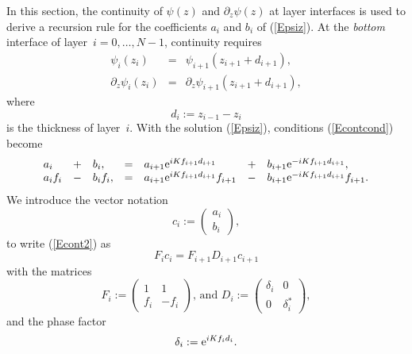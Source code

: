 In this section,
the continuity of $\psi(z)$ and $\partial_z\psi(z)$ at layer interfaces
is used to derive a recursion rule
for the coefficients $a_i$ and $b_i$ of (\ref{Epsiz}).
At the \textit{bottom} interface of layer~$i=0,\ldots,N-1$,
continuity requires
\begin{equation}\label{Econtcond}
  \begin{array}{lcl}
            \psi_{i}(z_i)&=&\psi_{i+1}(z_{i+1}+d_{i+1}),\\
            \partial_z\psi_{i}(z_i)&=&\partial_z\psi_{i+1}(z_{i+1}+d_{i+1}),
  \end{array}
\end{equation}
  where
\begin{equation}
  d_i:=z_{i-1}-z_{i}
\end{equation}
is the thickness of layer~$i$.
With the solution (\ref{Epsiz}), conditions (\ref{Econtcond}) become
\begin{equation}\label{Econt2}
  \begin{array}{lclclcl}
  a_i &+& b_i,
  &=&
  a_{i+1}\text{e}^{iKf_{i+1}d_{i+1}} &+& b_{i+1}\text{e}^{-iKf_{i+1}d_{i+1}},
  \\
  a_i f_i  &-& b_i f_i,
  &=&
 a_{i+1}\text{e}^{iKf_{i+1}d_{i+1}} f_{i+1} &-& b_{i+1}\text{e}^{-iKf_{i+1}d_{i+1}} f_{i+1}.
  \end{array}
\end{equation}
We introduce the vector notation
\begin{equation}\label{Evecc}
  c_i := \left( \begin{array}{c}a_i\\b_i\end{array} \right),
\end{equation}
to write (\ref{Econt2}) as
\begin{equation}\label{EFcFDc}
  F_i c_i = F_{i+1} D_{i+1} c_{i+1}
\end{equation}
with the matrices
\begin{equation}
  F_i := \left(\begin{array}{cc}1&1\\f_i&-f_i\end{array}\right)\text{, and }
  D_i := \left(\begin{array}{cc}\delta_i&0\\0&\delta_i^*\end{array}\right),
\end{equation}
and the phase factor
\begin{equation}
   \delta_i := \text{e}^{iKf_id_i}.
\end{equation}
